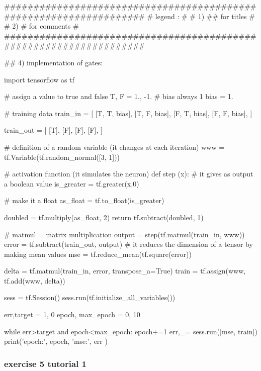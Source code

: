 \documentclass[11pt]{article}
\begin{document}
\begin{python}

###################################################################
# legend :                                                        #
#         1) ## for titles                                        #
#         2) #  for comments                                      #
###################################################################   


## 4) implementation of gates:

import tensorflow as tf
 
# assign a value to true and false
T, F = 1., -1.
# bias always 1
bias = 1.

# training data
train_in = [
        [T, T, bias],
        [T, F, bias],
        [F, T, bias],
        [F, F, bias],
]


train_out = [
    [T],
    [F],
    [F],
    [F],    
]

# definition of a random variable   (it changes at each iteration)
www = tf.Variable(tf.random_normal([3, 1]))

# activation function (it simulates the neuron)
def step (x):
    # it gives as output a boolean value
    is_greater = tf.greater(x,0)

    # make it a float
    as_float = tf.to_float(is_greater)
    
    doubled = tf.multiply(as_float, 2)
    return  tf.subtract(doubled, 1)


# matmul = matrix multiplication
output = step(tf.matmul(train_in, www))
error = tf.subtract(train_out, output)
# it reduces the dimension of a tensor by making mean values
mse = tf.reduce_mean(tf.square(error))

delta = tf.matmul(train_in, error, transpose_a=True)
train = tf.assign(www, tf.add(www, delta))

sess = tf.Session()
sess.run(tf.initialize_all_variables())

err,target = 1, 0
epoch, max_epoch = 0, 10

while err>target and  epoch<max_epoch:
    epoch+=1
    err,_= sess.run([mse, train])
    print('epoch:', epoch, 'mse:', err )
    
\end{python}
\clearpage

\subsubsection{exercise 5  tutorial 1}
\end{document}
